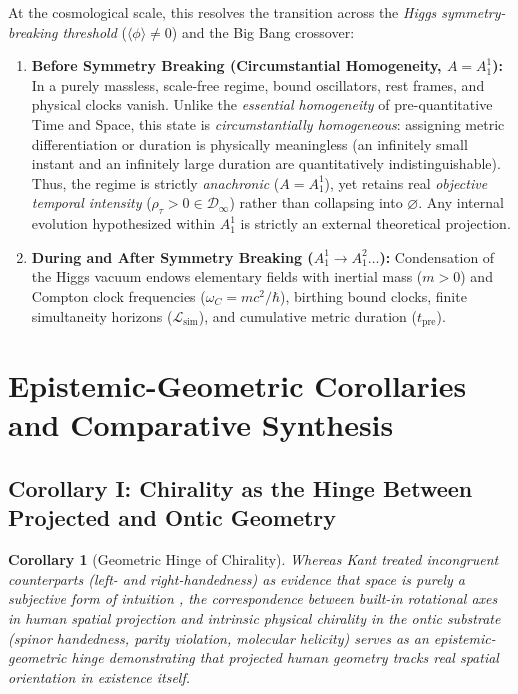 \documentclass[11pt,a4paper]{article}
\newtheorem{corollary}{Corollary}
\begin{document}
At the cosmological scale, this resolves the transition across the \emph{Higgs symmetry-breaking threshold} ($\langle \phi \rangle \neq 0$) and the Big Bang crossover:
\begin{enumerate}[label=\textbf{(\arabic*)}]
    \item \textbf{Before Symmetry Breaking (Circumstantial Homogeneity, $A = A_1^1$):} In a purely massless, scale-free regime, bound oscillators, rest frames, and physical clocks vanish. Unlike the \emph{essential homogeneity} of pre-quantitative Time and Space, this state is \emph{circumstantially homogeneous}: assigning metric differentiation or duration is physically meaningless (an infinitely small instant and an infinitely large duration are quantitatively indistinguishable). Thus, the regime is strictly \emph{anachronic} ($A = A_1^1$), yet retains real \emph{objective temporal intensity} ($\rho_\tau > 0 \in \mathcal{D}_\infty$) rather than collapsing into $\varnothing$. Any internal evolution hypothesized within $A_1^1$ is strictly an external theoretical projection.
    \item \textbf{During and After Symmetry Breaking ($A_1^1 \to A_1^2 \dots$):} Condensation of the Higgs vacuum endows elementary fields with inertial mass ($m > 0$) and Compton clock frequencies ($\omega_C = mc^2/\hbar$), birthing bound clocks, finite simultaneity horizons ($\mathcal{L}_{\mathrm{sim}}$), and cumulative metric duration ($t_{\mathrm{pre}}$).
\end{enumerate}

\section{Epistemic-Geometric Corollaries and Comparative Synthesis}

\subsection{Corollary I: Chirality as the Hinge Between Projected and Ontic Geometry}

\begin{corollary}[Geometric Hinge of Chirality]
Whereas Kant treated incongruent counterparts (left- and right-handedness) as evidence that space is purely a subjective form of intuition \cite{Kant1783}, the correspondence between built-in rotational axes in human spatial projection and intrinsic physical chirality in the ontic substrate (spinor handedness, parity violation, molecular helicity) serves as an epistemic-geometric hinge demonstrating that projected human geometry tracks real spatial orientation in existence itself.
\end{corollary}
\end{document}
